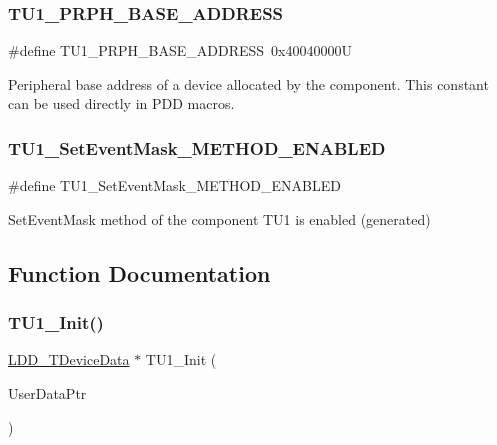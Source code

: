 \subsubsection{\texorpdfstring{T\+U1\+\_\+\+P\+R\+P\+H\+\_\+\+B\+A\+S\+E\+\_\+\+A\+D\+D\+R\+E\+SS}{TU1\_PRPH\_BASE\_ADDRESS}}
{\footnotesize\ttfamily \#define T\+U1\+\_\+\+P\+R\+P\+H\+\_\+\+B\+A\+S\+E\+\_\+\+A\+D\+D\+R\+E\+SS~0x40040000U}

Peripheral base address of a device allocated by the component. This constant can be used directly in P\+DD macros. \mbox{\label{group___t_u1__module_gad5683773669c6d1a98cc77b56ccbc9e8}} 
\subsubsection{\texorpdfstring{T\+U1\+\_\+\+Set\+Event\+Mask\+\_\+\+M\+E\+T\+H\+O\+D\+\_\+\+E\+N\+A\+B\+L\+ED}{TU1\_SetEventMask\_METHOD\_ENABLED}}
{\footnotesize\ttfamily \#define T\+U1\+\_\+\+Set\+Event\+Mask\+\_\+\+M\+E\+T\+H\+O\+D\+\_\+\+E\+N\+A\+B\+L\+ED}

Set\+Event\+Mask method of the component T\+U1 is enabled (generated) 

\subsection{Function Documentation}
\mbox{\label{group___t_u1__module_ga9bfbdf45fe9128c8d9e4245e3480d6da}} 
\subsubsection{\texorpdfstring{T\+U1\+\_\+\+Init()}{TU1\_Init()}}
{\footnotesize\ttfamily \hyperlink{group___p_e___types__module_gac5cf1362f1f0e3a2ce71b1bf2276d091}{L\+D\+D\+\_\+\+T\+Device\+Data} $\ast$ T\+U1\+\_\+\+Init (\begin{DoxyParamCaption}\item[{\hyperlink{group___p_e___types__module_ga0b66a73f87238a782318aa0be7578e35}{L\+D\+D\+\_\+\+T\+User\+Data} $\ast$}]{User\+Data\+Ptr }\end{DoxyParamCaption})}



